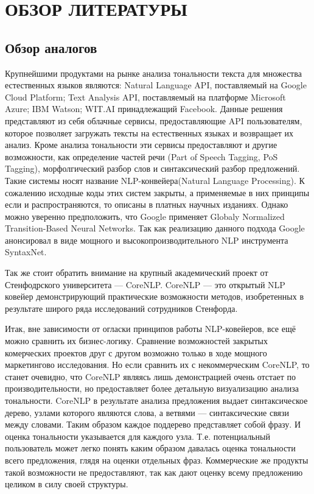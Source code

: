 \section{ОБЗОР ЛИТЕРАТУРЫ}\label{sec:overview}
\subsection{Обзор аналогов}\label{subsec:overview:overview_analogue}
Крупнейшими продуктами на рынке анализа тональности текста для множества естественных языков являются: Natural Language API, поставляемый на Google Cloud Platform; Text Analysis API, поставляемый на платформе Microsoft Azure; IBM Watson; WIT.AI принадлежащий Facebook. Данные решения представляют из себя облачные сервисы, предоставляющие API пользователям, которое позволяет загружать тексты на естественных языках и возвращает их анализ. Кроме анализа тональности эти сервисы предоставляют и другие возможности, как определение частей речи (Part of Speech Tagging, PoS Tagging), морфолгический разбор слов и синтаксический разбор предложений. Такие системы носят название NLP-конвейера(Natural Language Processing). К сожалению исходные коды этих систем закрыты, а применяемые в них принципы если и распространяются, то описаны в платных научных изданиях. Однако можно уверенно предположить, что Google применяет Globaly Normalized Transition-Based Neural Networks\cite{google_gntb}. Так как реализацию  данного подхода Google анонсировал в виде мощного и высокопроизводительного NLP инструмента SyntaxNet.

Так же стоит обратить внимание на крупный академический проект от Стенфодрского университета --- CoreNLP. CoreNLP --- это открытый NLP ковейер демонстрирующий практические возможности методов, изобретенных в результате широго ряда исследований сотрудников Стенфорда.

Итак, вне зависимости от огласки принципов работы NLP-ковейеров, все ещё можно сравнить их бизнес-логику. Сравнение возможностей закрытых комерческих проектов друг с другом возможно только в ходе мощного маркетингово исследования. Но если сравнить их с некоммерческим CoreNLP, то станет очевидно, что CoreNLP являясь лишь демонстрацией очень отстает по производительности, но предоставляет более детальную визуализацию анализа тональности. CoreNLP в результате анализа предложения выдает синтаксическое дерево, узлами которого являются слова, а ветвями --- синтаксические связи между словами. Таким образом каждое поддерево представляет собой фразу. И оценка тональности указывается для каждого узла. Т.е. потенциальный пользователь может легко понять каким образом давалась оценка тональности всего предложения, глядя на оценки отдельных фраз. Коммерческие же продукты такой возможности не предоставляют, так как дают оценку всему предложению целиком в силу своей структуры.
